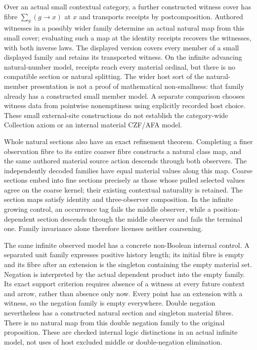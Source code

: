 \documentclass[11pt]{article}
\theoremstyle{definition}
\theoremstyle{remark}
\begin{document}
Over an actual small contextual category, a further constructed witness cover
has fibre $\sum_{g} (g\to x)$ at $x$ and transports receipts by
postcomposition.  Authored witnesses in a possibly wider family determine
an actual natural map from this small cover; evaluating such a map at the
identity receipts recovers the witnesses, with both inverse laws.
The displayed version covers every member of a small displayed family and
retains its transported witness.  On the infinite advancing natural-number
model, receipts reach every material ordinal, but there is no compatible
section or natural splitting.  The wider host sort of the natural-member
presentation is not a proof of mathematical non-smallness: that family
already has a constructed small member model.  A separate comparison chooses
witness data from pointwise nonemptiness using explicitly recorded host
choice.  These small external-site constructions do not establish the
category-wide Collection axiom or an internal material CZF/AFA model.

Whole natural sections also have an exact refinement theorem.  Completing
a finer observation fibre to its entire coarser fibre constructs a natural
class map, and the same authored material source action descends through both
observers.  The independently decoded families have equal material values
along this map.  Coarse sections embed into fine sections precisely as those
whose pulled selected values agree on the coarse kernel; their existing
contextual naturality is retained.  The section maps satisfy identity and
three-observer composition.  In the infinite growing control, an occurrence
tag fails the middle observer, while a position-dependent section descends
through the middle observer and fails the terminal one.  Family invariance
alone therefore licenses neither coarsening.

The same infinite observed model has a concrete non-Boolean internal control.
A separated unit family expresses positive history length; its initial fibre
is empty and its fibre after an extension is the singleton containing the
empty material set.  Negation is interpreted by the actual dependent product
into the empty family.  Its exact support criterion requires absence of a
witness at every future context and arrow, rather than absence only now.
Every point has an extension with a witness, so the negation family is empty
everywhere.  Double negation nevertheless has a constructed natural section
and singleton material fibres.  There is no natural map from this double
negation family to the original proposition.  These are checked internal
logic distinctions in an actual infinite model, not uses of host excluded
middle or double-negation elimination.
\end{document}
